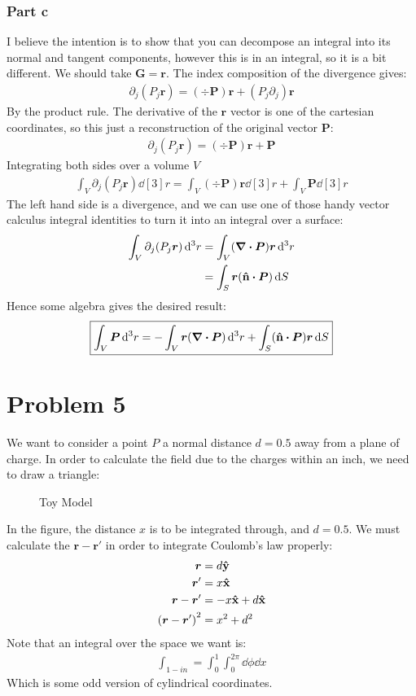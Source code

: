 \documentclass[12pt]{article}
\renewcommand{\vb}[1]{\bm{#1}}
\newcommand{\D}{\partial}
\begin{document}
\subsubsection*{Part c}
I believe the intention is to show that you can decompose an integral into its normal and tangent components, however this is in an integral, so it is a bit different. We should take $\vb{G}=\vb{r}$. The index composition of the divergence gives:
\begin{align*}
  \D_j(P_j\vb{r})=(\div{\vb{P}})\vb{r}+(P_j\D_j)\vb{r}
\end{align*}
By the product rule. The derivative of the $\vb{r}$ vector is one of the cartesian coordinates, so this just a reconstruction of the original vector $\vb{P}$:
\begin{align*}
  \D_j(P_j\vb{r})=(\div{\vb{P}})\vb{r}+\vb{P}
\end{align*}
Integrating both sides over a volume $V$
\begin{align*}
  \int_V\D_j(P_j\vb{r})\dd[3]{r}=\int_V(\div{\vb{P}})\vb{r}\dd[3]{r}
  +\int_V\vb{P}\dd[3]{r}
\end{align*}
The left hand side is a divergence, and we can use one of those handy vector calculus integral identities to turn it into an integral over a surface:
\begin{align*}
  \int_V\D_j(P_j\vb{r})\dd[3]{r}&=\int_V(\div{\vb{P}})\vb{r}\dd[3]{r}\\
  &=\int_S\vb{r}\qty(\vu{n}\vdot\vb{P})\dd{S}
\end{align*}
Hence some algebra gives the desired result:
\begin{align}
  \boxed{
    \int_V\vb{P}\dd[3]{r}=-\int_V\vb{r}\qty(\div{\vb{P}})\dd[3]{r}
    +\int_S(\vu{n}\vdot\vb{P})\vb{r}\dd{S}
  }
\end{align}
\section*{Problem 5}
We want to consider a point $P$ a normal distance $d=0.5$ away from a plane of charge. In order to calculate the field due to the charges within an inch, we need to draw a triangle:
\begin{figure}[H]
  \centering
  \caption{Toy Model}
\end{figure}
In the figure, the distance $x$ is to be integrated through, and $d=0.5$. We must calculate the $\vb{r}-\vb{r}'$ in order to integrate Coulomb's law properly:
\begin{align*}
  \vb{r}&=d\vu{y}\\
  \vb{r}'&=x\vu{x}\\
  \vb{r}-\vb{r}'&=-x\vu{x}+d\vu{x}\\
  \qty(\vb{r}-\vb{r}')^2&=x^2+d^2
\end{align*}
Note that an integral over the space we want is:
\begin{align*}
  \int_{1-in}=\int_0^1\int_0^{2\pi}\dd{\phi}\dd{x}
\end{align*}
Which is some odd version of cylindrical coordinates.
\end{document}
